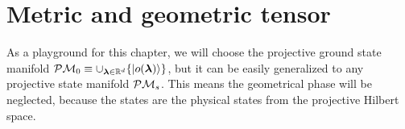 \section{Metric and geometric tensor}
As a playground for this chapter, we will choose the projective ground state manifold $\mathcal{P}\mathcal{M}_0\equiv \cup_{{\bm\lambda}\in\mathbb{R}^d} \{\ket{o({\bm\lambda})}\}$, but it can be easily generalized to any projective state manifold $\mathcal{P}\mathcal{M}_s$. This means the geometrical phase will be neglected, because the states are the physical states from the projective Hilbert space.

